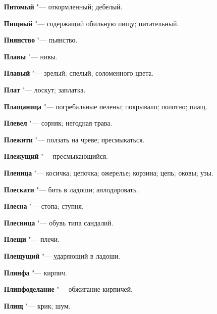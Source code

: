 \begin{mymulticols}{2}
\noindent\textbf{Питомый} "--- откормленный; дебелый. 




\noindent\textbf{Пищный} "--- содержащий обильную пищу; питательный. 




\noindent\textbf{Пиянство} "--- пьянство. 




\noindent\textbf{Плавы} "--- нивы. 




\noindent\textbf{Плавый} "--- зрелый; спелый, соломенного цвета. 




\noindent\textbf{Плат} "--- лоскут; заплатка. 




\noindent\textbf{Плащаница} "--- погребальные пелены; покрывало; полотно; плащ. 




\noindent\textbf{Плевел} "--- сорняк; негодная трава. 




\noindent\textbf{Плежити} "--- ползать на чреве; пресмыкаться. 




\noindent\textbf{Плежущий} "--- пресмыкающийся. 




\noindent\textbf{Пленица} "--- косичка; цепочка; ожерелье; корзина; цепь; оковы; узы. 




\noindent\textbf{Плескати} "--- бить в ладоши; аплодировать. 




\noindent\textbf{Плесна} "--- стопа; ступня. 




\noindent\textbf{Плесница} "--- обувь типа сандалий. 




\noindent\textbf{Плещи} "--- плечи. 




\noindent\textbf{Плещущий} "--- ударяющий в ладоши. 




\noindent\textbf{Плинфа} "--- кирпич. 




\noindent\textbf{Плинфоделание} "--- обжигание кирпичей. 




\noindent\textbf{Плищ} "--- крик; шум. 





\end{mymulticols}
